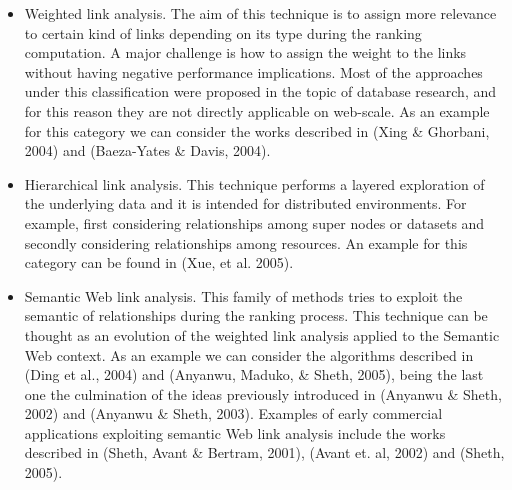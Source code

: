 \begin{itemize}
\item Weighted link analysis. The aim of this technique is to assign more relevance to certain kind of links depending on its type during the ranking 
computation. A major challenge is how to assign the weight to the links without having negative performance implications. Most of the approaches 
under this classification were proposed in the topic of database research, and for this reason they are not directly applicable on web-scale. 
As an example for this category we can consider the works described in \cite{}(Xing \& Ghorbani, 2004) and \cite{}(Baeza-Yates \& Davis, 2004).
\item Hierarchical link analysis. This technique performs a layered exploration of the underlying data and it is intended for distributed environments. 
For example, first considering relationships among super nodes or datasets and secondly considering relationships among resources. An example for this 
category can be found in \cite{}(Xue, et al. 2005).
\item Semantic Web link analysis. This family of methods tries to exploit the semantic of relationships during the ranking process. This technique can 
be thought as an evolution of the weighted link analysis applied to the Semantic Web context. As an example we can consider the algorithms described 
in \cite{}(Ding et al., 2004) and \cite{}(Anyanwu, Maduko, \& Sheth, 2005), being the last one the culmination of the ideas previously introduced in 
\cite{}(Anyanwu \& Sheth, 2002) and \cite{}(Anyanwu \& Sheth, 2003). Examples of early commercial applications exploiting semantic Web link analysis include the 
works described in \cite{}(Sheth, Avant \& Bertram, 2001), \cite{}(Avant et. al, 2002) and \cite{}(Sheth, 2005).
\end{itemize}



